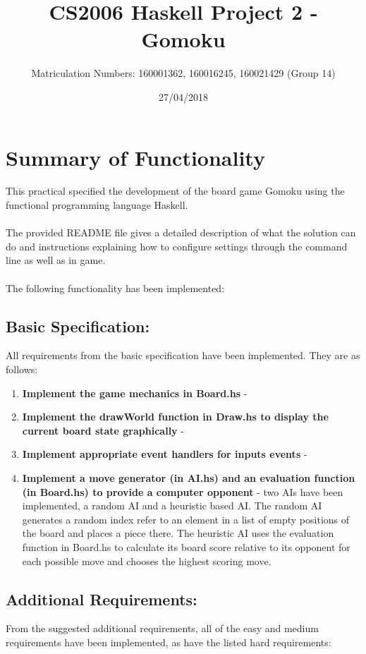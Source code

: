 \documentclass[11]{article}
\title{CS2006 Haskell Project 2 - \\ Gomoku}
\date{27/04/2018}
\author{Matriculation Numbers: 160001362, 160016245, 160021429 (Group 14)}
\begin{document}
	\maketitle
	\newpage
	\tableofcontents
	
	\newpage
	\section{Summary of Functionality}
		This practical specified the development of the board game Gomoku using the functional programming language Haskell. \\\\The provided README file gives a detailed description of what the solution can do and instructions explaining how to configure settings through the command line as well as in game.
\\\\The following functionality has been implemented:
	\subsection{Basic Specification:}
		All requirements from the basic specification have been implemented. They are as follows:	
		\begin{enumerate}
			\item \textbf{Implement the game mechanics in Board.hs} -
			\item \textbf{Implement the drawWorld function in Draw.hs to display the current board state graphically} -
			\item \textbf{Implement appropriate event handlers for inputs events} -
			\item \textbf{Implement a move generator (in AI.hs) and an evaluation function (in Board.hs) to provide a computer opponent} - two AIs have been implemented, a random AI and a heuristic based AI. The random AI generates a random index refer to an element in a list of empty positions of the board and places a piece there. The heuristic AI uses the evaluation function in Board.hs to calculate its board score relative to its opponent for each possible move and chooses the highest scoring move.
		\end{enumerate}
	
	\subsection{Additional Requirements:}
	 From the suggested additional requirements, all of the easy and medium requirements have been implemented, as have the listed hard requirements:
\end{document}
